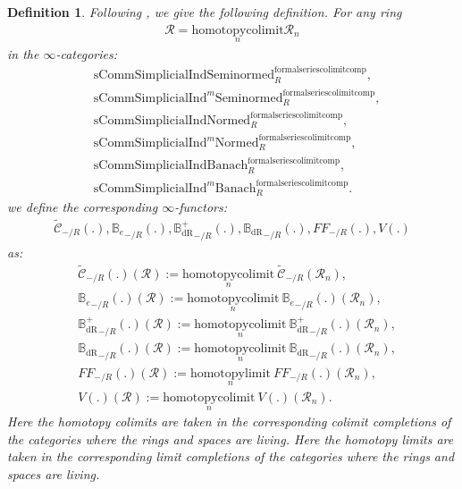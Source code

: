 \documentclass[12pt]{book}
\newtheorem{definition}{Definition}
\begin{document}
\begin{definition}
Following \cite[Definition 9.3.3, Definition 9.3.5, Definition 9.3.11, Definition 9.3.9]{KL1}, \cite{KL2} we give the following definition. For any ring
\begin{align}
\mathcal{R}=\underset{n}{\mathrm{homotopycolimit}}\mathcal{R}_n	
\end{align}
in the $\infty$-categories:
\begin{align}
&\mathrm{sComm}\mathrm{Simplicial}\mathrm{Ind}\mathrm{Seminormed}^\mathrm{formalseriescolimitcomp}_R,\\
&\mathrm{sComm}\mathrm{Simplicial}\mathrm{Ind}^m\mathrm{Seminormed}^\mathrm{formalseriescolimitcomp}_R,\\
&\mathrm{sComm}\mathrm{Simplicial}\mathrm{Ind}\mathrm{Normed}^\mathrm{formalseriescolimitcomp}_R,\\
&\mathrm{sComm}\mathrm{Simplicial}\mathrm{Ind}^m\mathrm{Normed}^\mathrm{formalseriescolimitcomp}_R,\\
&\mathrm{sComm}\mathrm{Simplicial}\mathrm{Ind}\mathrm{Banach}^\mathrm{formalseriescolimitcomp}_R,\\
&\mathrm{sComm}\mathrm{Simplicial}\mathrm{Ind}^m\mathrm{Banach}^\mathrm{formalseriescolimitcomp}_R.	
\end{align}	
we define the corresponding $\infty$-functors:
\begin{align}
\widetilde{\mathcal{C}}_{-/R}(.),{\mathbb{B}_e}_{-/R}(.),{\mathbb{B}_\mathrm{dR}^+}_{-/R}(.),{\mathbb{B}_\mathrm{dR}}_{-/R}(.),{FF}_{-/R}(.),V(.)	
\end{align}
as:
\begin{align}
&\widetilde{\mathcal{C}}_{-/R}(.)(\mathcal{R}):=\underset{n}{\mathrm{homotopycolimit}}~\widetilde{\mathcal{C}}_{-/R}(\mathcal{R}_n),\\
&{\mathbb{B}_e}_{-/R}(.)(\mathcal{R}):=\underset{n}{\mathrm{homotopycolimit}}~{\mathbb{B}_e}_{-/R}(.)(\mathcal{R}_n),\\
&{\mathbb{B}_\mathrm{dR}^+}_{-/R}(.)(\mathcal{R}):=\underset{n}{\mathrm{homotopycolimit}}~{\mathbb{B}_\mathrm{dR}^+}_{-/R}(.)(\mathcal{R}_n),\\
&{\mathbb{B}_\mathrm{dR}}_{-/R}(.)(\mathcal{R}):=\underset{n}{\mathrm{homotopycolimit}}~{\mathbb{B}_\mathrm{dR}}_{-/R}(.)(\mathcal{R}_n),\\
&{{FF}}_{-/R}(.)(\mathcal{R}):=\underset{n}{\mathrm{homotopylimit}}~{{FF}}_{-/R}(.)(\mathcal{R}_n),\\	
&V(.)(\mathcal{R}):=\underset{n}{\mathrm{homotopycolimit}}~V(.)(\mathcal{R}_n).
\end{align}
Here the homotopy colimits are taken in the corresponding colimit completions of the categories where the rings and spaces are living. Here the homotopy limits are taken in the corresponding limit completions of the categories where the rings and spaces are living.
\end{definition}
\end{document}
